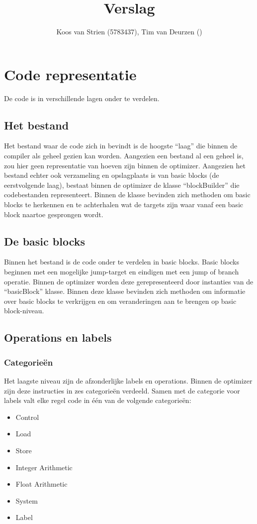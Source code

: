 \documentclass[a4paper,10pt]{article}
\author{Koos van Strien (5783437), Tim van Deurzen ()}
\title{Verslag}
\begin{document}
\maketitle

\section{Code representatie}
De code is in verschillende lagen onder te verdelen.

\subsection{Het bestand}
Het bestand waar de code zich in bevindt is de hoogste ``laag'' die binnen de
compiler als geheel gezien kan worden.  Aangezien een bestand al een geheel is,
zou hier geen representatie van hoeven zijn binnen de optimizer. Aangezien het
bestand echter ook verzameling en opslagplaats is van basic blocks (de
eerstvolgende laag), bestaat binnen de optimizer de klasse ``blockBuilder'' die
codebestanden representeert. Binnen de klasse bevinden zich methoden om basic
blocks te herkennen en te achterhalen wat de targets zijn waar vanaf een basic
block naartoe gesprongen wordt.


\subsection{De basic blocks}
Binnen het bestand is de code onder te verdelen in basic blocks. Basic blocks
beginnen met een mogelijke jump-target en eindigen met een jump of branch
operatie. Binnen de optimizer worden deze gerepresenteerd door instanties 
van de ``basicBlock'' klasse. Binnen deze klasse bevinden zich methoden om
informatie over basic blocks te verkrijgen en om veranderingen aan te brengen
op basic block-niveau.

\subsection{Operations en labels}
\subsubsection{Categorie\"en}
Het laagste niveau zijn de afzonderlijke labels en operations. Binnen de
optimizer zijn deze instructies in zes categorie\"en verdeeld. Samen met de
categorie voor labels valt elke regel code in \'e\'en van de volgende
categorie\"en:
\begin{itemize}
\item Control
\item Load
\item Store
\item Integer Arithmetic
\item Float Arithmetic
\item System
\item Label
\end{itemize}
\end{document}

